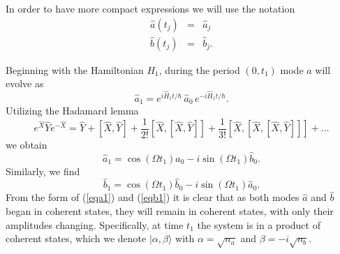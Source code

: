 \documentclass{iopart}
\begin{document}
In order to have more compact expressions we will use the notation
\begin{eqnarray}
\hat{a}(t_j) &=& \hat{a}_j \\
\hat{b}(t_j) &=& \hat{b}_j.
\end{eqnarray}

Beginning with the Hamiltonian $H_1$, during the period $(0, t_1)$ mode $\hat{a}$ will evolve as
\begin{equation}
\hat{a}_1 = e^{ i \hat{H}_1 t/ \hbar} \, \hat{a}_0 \, e^{-i \hat{H}_1 t/ \hbar}.
\end{equation}
Utilizing the Hadamard lemma
\begin{equation}
e^{\hat{X}} \hat{Y} e^{-\hat{X}} = \hat{Y} + [\hat{X},\hat{Y}] + \frac{1}{2!}[\hat{X},[\hat{X},\hat{Y}]] + \frac{1}{3!}[\hat{X},[\hat{X},[\hat{X},\hat{Y}]]] + \ldots
\label{eqHadamard}
\end{equation}
we obtain 
\begin{equation}
\hat{a}_1 =  \cos (\Omega t_1) \hat{a}_0 -i \sin (\Omega t_1) \hat{b}_0.
\label{eqa1}
\end{equation}
Similarly, we find
\begin{equation}
\hat{b}_1 = \cos (\Omega t_1) \hat{b}_0 - i \sin (\Omega t_1) \hat{a}_0.
\label{eqb1}
\end{equation}
From the form of (\ref{eqa1}) and (\ref{eqb1}) it is clear that as both modes $\hat{a}$ and $\hat{b}$ began in coherent states, they will remain in coherent states, with only their amplitudes changing. Specifically, at time $t_1$ the system is in a product of coherent states, which we denote $|\alpha, \beta\rangle$ with $\alpha=\sqrt{n_a}$ and $\beta=-i\sqrt{n_b}$.
\end{document}
